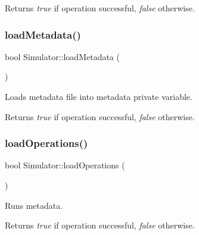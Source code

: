 \begin{DoxyReturn}{Returns}
{\itshape true} if operation successful, {\itshape false} otherwise. 
\end{DoxyReturn}
\hypertarget{class_simulator_a2291f67b3ef8be115f4bb34e035b2acc}{}\label{class_simulator_a2291f67b3ef8be115f4bb34e035b2acc} 
\subsubsection{\texorpdfstring{load\+Metadata()}{loadMetadata()}}
{\footnotesize\ttfamily bool Simulator\+::load\+Metadata (\begin{DoxyParamCaption}{ }\end{DoxyParamCaption})\hspace{0.3cm}{\ttfamily [private]}}



Loads metadata file into \textquotesingle{}metadata\textquotesingle{} private variable. 

\begin{DoxyReturn}{Returns}
{\itshape true} if operation successful, {\itshape false} otherwise. 
\end{DoxyReturn}
\hypertarget{class_simulator_a19639209921d8abc828d14e319df637e}{}\label{class_simulator_a19639209921d8abc828d14e319df637e} 
\subsubsection{\texorpdfstring{load\+Operations()}{loadOperations()}}
{\footnotesize\ttfamily bool Simulator\+::load\+Operations (\begin{DoxyParamCaption}{ }\end{DoxyParamCaption})\hspace{0.3cm}{\ttfamily [private]}}



Runs metadata. 

\begin{DoxyReturn}{Returns}
{\itshape true} if operation successful, {\itshape false} otherwise. 
\end{DoxyReturn}
\hypertarget{class_simulator_a8cf2f0d42cabac22dc4b6eda745189ae}{}\label{class_simulator_a8cf2f0d42cabac22dc4b6eda745189ae} 
